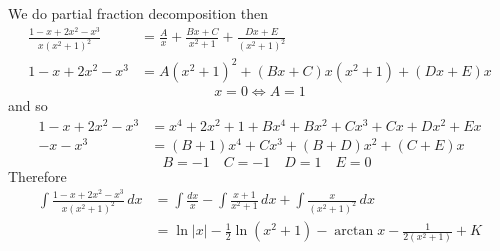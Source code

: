 \begin{solution}
    We do partial fraction decomposition then
    \begin{align*}
        \frac{1-x+2x^2-x^3}{x(x^2+1)^2}
        &= \frac{A}{x}+\frac{Bx+C}{x^2+1}+\frac{Dx+E}{(x^2+1)^2} \\
        1-x+2x^2-x^3 &= A(x^2+1)^2+(Bx+C)x(x^2+1)+(Dx+E)x
    \end{align*}
    \[x=0\iff A=1\]
    and so
    \begin{align*}
        1-x+2x^2-x^3 &= x^4+2x^2+1+Bx^4+Bx^2+Cx^3+Cx+Dx^2+Ex \\
        -x-x^3 &= (B+1)x^4+Cx^3+(B+D)x^2+(C+E)x
    \end{align*}
    \[\quad B=-1\quad C=-1\quad D=1\quad E=0\]
    Therefore
    \begin{align*}
        \int\frac{1-x+2x^2-x^3}{x(x^2+1)^2}\,dx
        &= \int\frac{dx}{x}-\int\frac{x+1}{x^2+1}\,dx
        +\int\frac{x}{(x^2+1)^2}\,dx \\
        &= \ln|x|-\frac{1}{2}\ln(x^2+1)-\arctan x
        -\frac{1}{2(x^2+1)}+K
    \end{align*}
\end{solution}